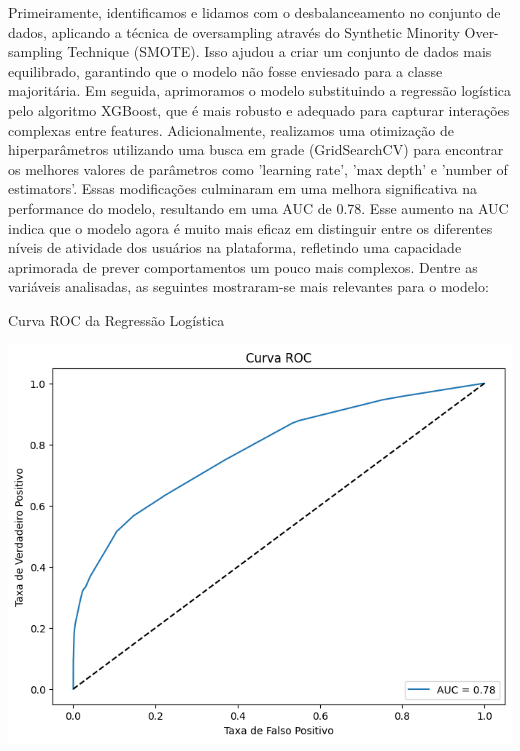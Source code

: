 Primeiramente, identificamos e lidamos com o desbalanceamento no conjunto de dados, aplicando a técnica de oversampling através do Synthetic Minority Over-sampling Technique (SMOTE). Isso ajudou a criar um conjunto de dados mais equilibrado, garantindo que o modelo não fosse enviesado para a classe majoritária. Em seguida, aprimoramos o modelo substituindo a regressão logística pelo algoritmo XGBoost, que é mais robusto e adequado para capturar interações complexas entre features. Adicionalmente, realizamos uma otimização de hiperparâmetros utilizando uma busca em grade (GridSearchCV) para encontrar os melhores valores de parâmetros como 'learning rate', 'max depth' e 'number of estimators'. Essas modificações culminaram em uma melhora significativa na performance do modelo, resultando em uma AUC de 0.78. Esse aumento na AUC indica que o modelo agora é muito mais eficaz em distinguir entre os diferentes níveis de atividade dos usuários na plataforma, refletindo uma capacidade aprimorada de prever comportamentos um pouco mais complexos. Dentre as variáveis analisadas, as seguintes mostraram-se mais relevantes para o modelo:

\begin{quadro}[!htb]
	\caption{Curva ROC da Regressão Logística}
	\label{fig:xgb_roc}
	\centering
	\includegraphics[scale=0.8]{images/xgb_roc.png}
\end{quadro}

